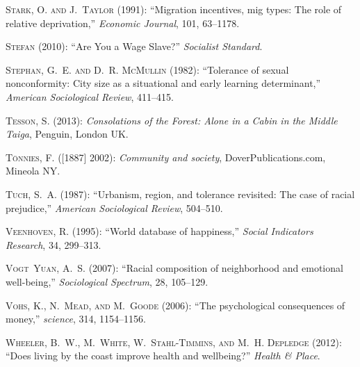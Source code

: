 \documentclass[10pt, letterpaper]{article}
\begin{document}
\begin{spacing}{2.0}
\begin{thebibliography}{115}
\textsc{Stark, O. and J.~Taylor} (1991): \enquote{{Migration incentives, mig
  types: The role of relative deprivation},} \emph{Economic Journal}, 101,
  63--1178.

\textsc{Stefan} (2010): \enquote{Are You a Wage Slave?} \emph{Socialist
  Standard}.

\textsc{Stephan, G.~E. and D.~R. McMullin} (1982): \enquote{Tolerance of sexual
  nonconformity: City size as a situational and early learning determinant,}
  \emph{American Sociological Review}, 411--415.

\textsc{Tesson, S.} (2013): \emph{Consolations of the Forest: Alone in a Cabin
  in the Middle Taiga}, Penguin, London UK.

\textsc{T{\"o}nnies, F.} ([1887] 2002): \emph{Community and society},
  DoverPublications.com, Mineola NY.

\textsc{Tuch, S.~A.} (1987): \enquote{Urbanism, region, and tolerance
  revisited: The case of racial prejudice,} \emph{American Sociological
  Review}, 504--510.

\textsc{Veenhoven, R.} (1995): \enquote{World database of happiness,}
  \emph{Social Indicators Research}, 34, 299--313.

\textsc{Vogt~Yuan, A.~S.} (2007): \enquote{Racial composition of neighborhood
  and emotional well-being,} \emph{Sociological Spectrum}, 28, 105--129.

\textsc{Vohs, K., N.~Mead, and M.~Goode} (2006): \enquote{The psychological
  consequences of money,} \emph{science}, 314, 1154--1156.

\textsc{Wheeler, B.~W., M.~White, W.~Stahl-Timmins, and M.~H. Depledge} (2012):
  \enquote{Does living by the coast improve health and wellbeing?} \emph{Health
  \& Place}.


\end{thebibliography}
\end{spacing}
\end{document}

